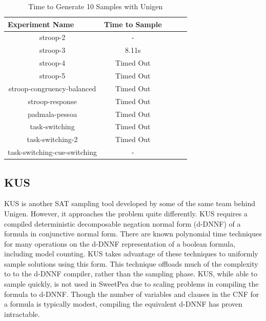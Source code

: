 \begin{table}[t]
  \centering
  \caption{Time to Generate 10 Samples with Unigen}
\begin{tabular}{|c|c|c|c|c|}
\hline
\multicolumn{1}{|l|}{Experiment Name} & Time to Sample  \\ \hline
stroop-2                              & -               \\ \hline
stroop-3                              & 8.11s           \\ \hline
stroop-4                              & Timed Out       \\ \hline
stroop-5                              & Timed Out       \\ \hline
stroop-congruency-balanced            & Timed Out       \\ \hline
stroop-response                       & Timed Out       \\ \hline
padmala-pessoa                        & Timed Out       \\ \hline
task-switching                        & Timed Out       \\ \hline
task-switching-2                      & Timed Out       \\ \hline
task-switching-cue-switching          & -               \\ \hline
\end{tabular}
\label{tab:benchmark_experiments_unigen}%
\end{table}


\subsection{KUS}

KUS \cite{SGRM18} is another SAT sampling tool developed by some of the same team behind Unigen. However, it approaches the problem quite differently. KUS requires a compiled deterministic decomposable negation normal form (d-DNNF) of a formula in conjunctive normal form. There are known polynomial time techniques for many operations on the d-DNNF representation of a boolean formula, including model counting. KUS takes advantage of these techniques to uniformly sample solutions using this form. This technique offloads much of the complexity to to the d-DNNF compiler, rather than the sampling phase. KUS, while able to sample quickly, is not used in SweetPea due to scaling problems in compiling the formula to d-DNNF. Though the number of variables and clauses in the CNF for a formula is typically modest, compiling the equivalent d-DNNF has proven intractable.


